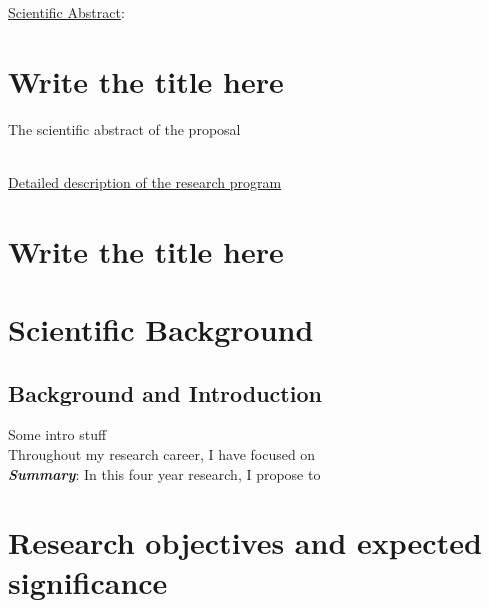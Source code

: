 \documentclass[a4paper,11pt]{article}
\title{\mytitle}
\author{}
\date{}
\begin{document}


\noindent\textsf{\underline{Scientific Abstract}:}

\section*{\centering Write the title here }

The scientific abstract of the proposal

\newpage



\Large\textsf{\\\underline{Detailed description of the research program}\\}
\normalsize

\section*{\vspace{-5px}\centering\LARGE   Write the title here}

\section{Scientific Background}
\label{sec:scientific_background}

\subsection{Background and Introduction}\label{sec:stateofart:intro}

Some intro stuff
\\


Throughout my research career, I have focused on
\\

\noindent\textit{\textbf{Summary}}:
In this four year research, I propose to

\section{Research objectives and expected significance}
\label{sec:objectives}
\end{document}
